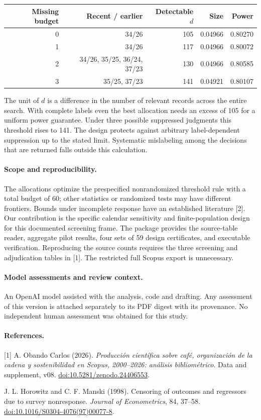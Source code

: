 \documentclass[11pt]{article}
\begin{document}
\begin{center}
\begin{tabular}{rrrrr}
\toprule
Missing budget & Recent / earlier & Detectable $d$ & Size & Power\\
\midrule
0 & 34/26 & 105 & 0.04966 & 0.80270\\
1 & 34/26 & 117 & 0.04966 & 0.80072\\
2 & 34/26, 35/25, 36/24, 37/23 & 130 & 0.04966 & 0.80585\\
3 & 35/25, 37/23 & 141 & 0.04921 & 0.80107\\
\bottomrule
\end{tabular}
\end{center}
The unit of $d$ is a difference in the number of relevant records across the entire search. With complete labels even the best allocation needs an excess of 105 for a uniform power guarantee. Under three possible suppressed judgments this threshold rises to 141. The design protects against arbitrary label-dependent suppression up to the stated limit. Systematic mislabeling among the decisions that are returned falls outside this calculation.

\paragraph{Scope and reproducibility.}
The allocations optimize the prespecified nonrandomized threshold rule with a total budget of 60; other statistics or randomized tests may have different frontiers. Bounds under incomplete response have an established literature [2]. Our contribution is the specific calendar sensitivity and finite-population design for this documented screening frame. The package provides the source-table reader, aggregate pilot results, four sets of 59 design certificates, and executable verification. Reproducing the source counts requires the three screening and adjudication tables in [1]. The restricted full Scopus export is unnecessary.

\paragraph{Model assessments and review context.}
An OpenAI model assisted with the analysis, code and drafting. Any assessment of this version is attached separately to its PDF digest with its provenance. No independent human assessment was obtained for this study.

\paragraph{References.}
[1] A. Obando Carlos (2026). \emph{Producci\'on cient\'ifica sobre caf\'e, organizaci\'on de la cadena y sostenibilidad en Scopus, 2000--2026: an\'alisis bibliom\'etrico}. Data and supplement, v08. \href{https://doi.org/10.5281/zenodo.24406553}{doi:10.5281/zenodo.24406553}.

\smallskip\noindent
[2] J. L. Horowitz and C. F. Manski (1998). Censoring of outcomes and regressors due to survey nonresponse. \emph{Journal of Econometrics}, 84, 37--58. \href{https://doi.org/10.1016/S0304-4076(97)00077-8}{doi:10.1016/S0304-4076(97)00077-8}.
\end{document}
